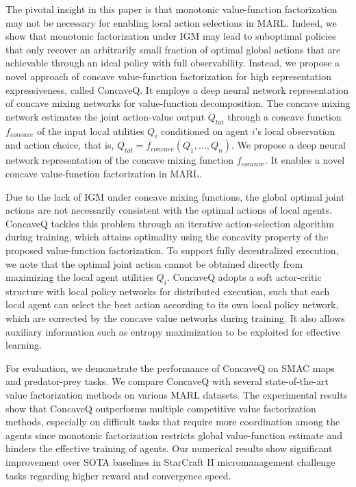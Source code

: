 The pivotal insight in this paper is that monotonic value-function factorization may not be necessary for enabling local action selections in MARL. Indeed, we show that monotonic factorization under IGM may lead to suboptimal policies that only recover an arbitrarily small fraction of optimal global actions that are achievable through an ideal policy with full observability.
Instead, we propose a novel approach of concave value-function factorization for high representation expressiveness, called ConcaveQ. It employs a deep neural network representation of concave mixing networks for value-function decomposition. The concave mixing network estimates the joint action-value output $Q_{tot}$ through a concave function $f_{concave}$ of the input local utilities $Q_i$ conditioned on agent $i$'s local observation and action choice, that is, $Q_{tot} = f_{concave}(Q_1, ..., Q_n)$. We propose a deep neural network representation of the concave mixing function $f_{concave}$. It enables a novel concave value-function factorization in MARL.

Due to the lack of IGM under concave mixing functions, the global optimal joint actions are not necessarily consistent with the optimal actions of local agents. ConcaveQ tackles this problem through an iterative action-selection algorithm during training, which attains optimality using the concavity property of the proposed value-function factorization. To support fully decentralized execution, we note that the optimal joint action cannot be obtained directly from maximizing the local agent utilities $Q_i$. ConcaveQ adopts a soft actor-critic structure with local policy networks for distributed execution, such that each local agent can select the best action according to its own local policy network, which are corrected by the concave value networks during training. It also allows auxiliary information such as entropy maximization to be exploited for effective learning.



For evaluation, we demonstrate the performance of ConcaveQ on SMAC maps and predator-prey tasks. We compare ConcaveQ with several state-of-the-art value factorization methods on various MARL datasets. The experimental results show that ConcaveQ outperforms multiple competitive value factorization methods, especially on difficult tasks that require more coordination among the agents since monotonic factorization restricts global value-function estimate and hinders the effective training of agents.
Our numerical results show significant improvement over SOTA baselines in StarCraft II micromanagement challenge tasks regarding higher reward and convergence speed.
